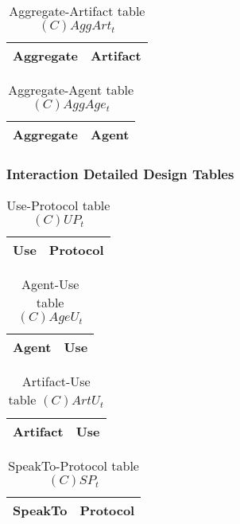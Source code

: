 \begin{table}[H]
	\centering
	\begin{tabular}{|p{4cm}|p{8cm}|}
			\hline
			\textbf{Aggregate} & \textbf{Artifact} \\
			\hline
			\hline
		\end{tabular}
	\caption{Aggregate-Artifact table $(C)AggArt_t$}
	\label{tab:caggartt}
\end{table}

\begin{table}[H]
	\centering
	\begin{tabular}{|p{4cm}|p{8cm}|}
			\hline
			\textbf{Aggregate} & \textbf{Agent} \\
			\hline
			\hline
		\end{tabular}
	\caption{Aggregate-Agent table $(C)AggAge_t$}
	\label{tab:caggaget}
\end{table}

\subsubsection{Interaction Detailed Design Tables}

\begin{table}[H]
	\centering
	\begin{tabular}{|p{4cm}|p{8cm}|}
			\hline
			\textbf{Use} & \textbf{Protocol} \\
			\hline
			\hline
		\end{tabular}
	\caption{Use-Protocol table $(C)UP_t$}
	\label{tab:cupt}
\end{table}

\begin{table}[H]
	\centering
	\begin{tabular}{|p{4cm}|p{8cm}|}
			\hline
			\textbf{Agent} & \textbf{Use} \\
			\hline
			\hline
		\end{tabular}
	\caption{Agent-Use table $(C)AgeU_t$}
	\label{tab:cageut}
\end{table}

\begin{table}[H]
	\centering
	\begin{tabular}{|p{4cm}|p{8cm}|}
			\hline
			\textbf{Artifact} & \textbf{Use} \\
			\hline
			\hline
		\end{tabular}
	\caption{Artifact-Use table $(C)ArtU_t$}
	\label{tab:cartut}
\end{table}

\begin{table}[H]
	\centering
	\begin{tabular}{|p{4cm}|p{8cm}|}
			\hline
			\textbf{SpeakTo} & \textbf{Protocol} \\
			\hline
			\hline
		\end{tabular}
	\caption{SpeakTo-Protocol table $(C)SP_t$}
	\label{tab:cspt}
\end{table}

